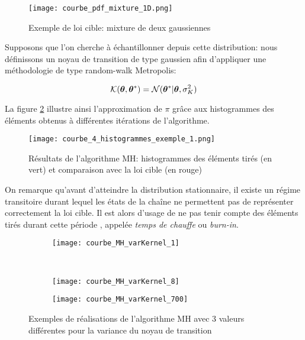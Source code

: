 \begin{figure}[h!]
	\centering
	\texttt{[image: courbe\_pdf\_mixture\_1D.png]}
	\caption{Exemple de loi cible: mixture de deux gaussiennes}
	\label{fig_courbe_pdf_mixture_1D}
\end{figure}


 Supposons que l'on cherche à échantillonner depuis cette distribution: nous définissons un noyau de transition de type gaussien afin d'appliquer une méthodologie de type random-walk Metropolis: 

\begin{equation}
{\mathcal{K}}({\bm{\theta}}, {{\bm{\theta}}^*} ) = \mathcal{N}({{\bm{\theta}}^*} | {\bm{\theta}}, \sigma_{K}^2)
\label{eq_noyau_gaussien}
\end{equation}

La figure \ref{fig_courbe_4_histogrammes_exemple_1} illustre ainsi l'approximation de $\pi$ grâce aux histogrammes des éléments obtenus à différentes itérations de l'algorithme. 

\begin{figure}[h!]
	\centering
	\texttt{[image: courbe\_4\_histogrammes\_exemple\_1.png]}
	\caption{Résultats de l'algorithme MH: histogrammes des éléments tirés (en vert) et comparaison avec la loi cible (en rouge)}
	\label{fig_courbe_4_histogrammes_exemple_1}
\end{figure}

On remarque qu'avant d'atteindre la distribution stationnaire, il existe un régime transitoire durant lequel les états de la chaîne ne permettent pas de représenter correctement la loi cible. Il est alors d'usage de ne pas tenir compte des éléments tirés durant cette période , appelée \textit{temps de chauffe} ou \textit{burn-in}. \\


\begin{figure}[h!]
	\centering
	\begin{subfigure}[t]{0.5\textwidth}
		\centering
		\texttt{[image: courbe\_MH\_varKernel\_1]}
		\caption{}
		\label{subfig_varK_1}
	\end{subfigure}%
	~ 
	\begin{subfigure}[t]{0.5\textwidth}
		\centering
		\texttt{[image: courbe\_MH\_varKernel\_8]}
		\caption{}
		\label{subfig_varK_8}
	\end{subfigure}
	\begin{subfigure}{0.5\textwidth}
		\centering
		\texttt{[image: courbe\_MH\_varKernel\_700]}
		\caption{}
		\label{subfig_varK_700}
	\end{subfigure}
	
	\caption{Exemples de réalisations de l'algorithme MH avec 3 valeurs différentes pour la variance du noyau de transition}
\end{figure}

